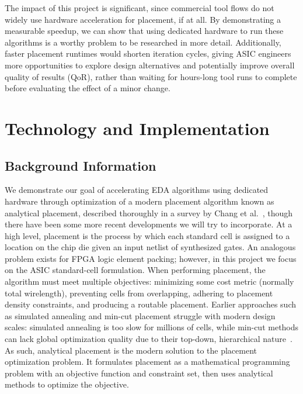 \documentclass[conference]{IEEEtran}
\begin{document}
The impact of this project is significant, since commercial tool flows do not widely use hardware acceleration for placement, if at all. By demonstrating a measurable speedup, we can show that using dedicated hardware to run these algorithms is a worthy problem to be researched in more detail. Additionally, faster placement runtimes would shorten iteration cycles, giving ASIC engineers more opportunities to explore design alternatives and potentially improve overall quality of results (QoR), rather than waiting for hours-long tool runs to complete before evaluating the effect of a minor change.

\section{Technology and Implementation}

\subsection{Background Information}

We demonstrate our goal of accelerating EDA algorithms using dedicated hardware through optimization of a modern placement algorithm known as analytical placement, described thoroughly in a survey by Chang et al.~\cite{chang2007analytical}, though there have been some more recent developments we will try to incorporate. At a high level, placement is the process by which each standard cell is assigned to a location on the chip die given an input netlist of synthesized gates. An analogous problem exists for FPGA logic element packing; however, in this project we focus on the ASIC standard-cell formulation. When performing placement, the algorithm must meet multiple objectives: minimizing some cost metric (normally total wirelength), preventing cells from overlapping, adhering to placement density constraints, and producing a routable placement. Earlier approaches such as simulated annealing and min-cut placement struggle with modern design scales: simulated annealing is too slow for millions of cells, while min-cut methods can lack global optimization quality due to their top-down, hierarchical nature~\cite{chang2007analytical}. As such, analytical placement is the modern solution to the placement optimization problem. It formulates placement as a mathematical programming problem with an objective function and constraint set, then uses analytical methods to optimize the objective.
\end{document}
